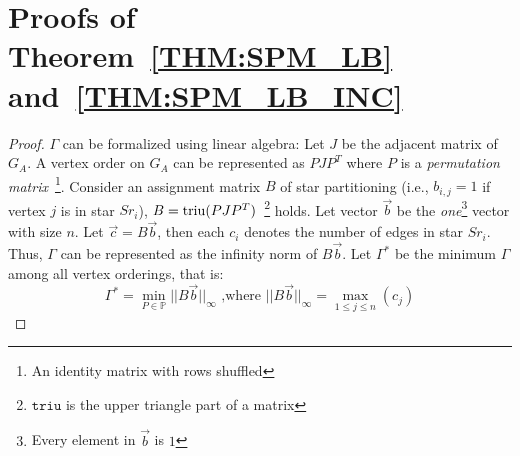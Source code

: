 \appendix
\section{Proofs of Theorem~\ref{THM:SPM_LB} and~\ref{THM:SPM_LB_INC}}
\label{apx:thm2proof}
\begin{proof}
$\Gamma$ can be formalized using linear algebra:
Let $J$ be the adjacent matrix of $G_A$.
A vertex order on $G_A$ can be represented as 
%
$PJP^T$
where $P$ %
is a %
\emph{permutation matrix}~\footnote{An identity matrix with rows shuffled}.
Consider an assignment matrix $B$ of star partitioning (i.e., $b_{i,j} = 1$ if vertex $j$ is in star $Sr_i$),
$B=\operatorname*{triu}(PJP^T)$~\footnote{$\mathtt{triu}$ is the upper triangle part of a matrix} holds.
%
Let vector $\vec{b}$ be the \textit{one}\footnote{Every element in $\vec{b}$ is $1$} 
vector with size $n$. Let $\vec{c} = B\vec{b}$, then each $c_i$ 
denotes the number of edges in star $Sr_i$. Thus, $\Gamma$ can be represented
as the infinity norm of $B\vec{b}$. Let $\Gamma^*$ be the minimum $\Gamma$ among all vertex orderings, that is:
\begin{equation}
\Gamma^* = \min_{P \in \mathbb{P}}{||B\vec{b}||_\infty} \text{ ,where } ||B\vec{b}||_\infty = \max_{1\leq j \leq n}(c_j)
\end{equation}


\end{proof}
